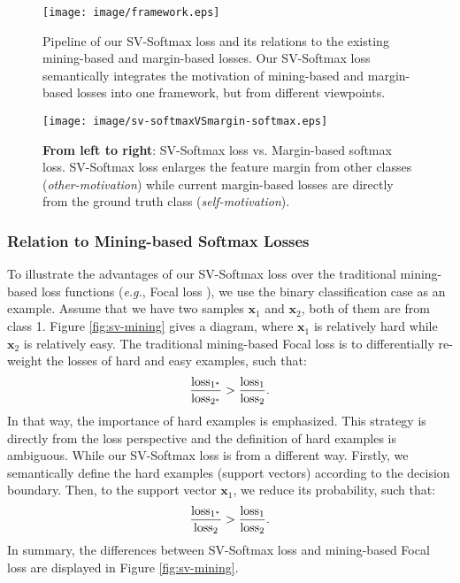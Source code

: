 \documentclass[10pt,twocolumn,letterpaper]{article}
\begin{document}
\begin{figure*}[t]
\begin{center}
   \texttt{[image: image/framework.eps]}
\end{center}
   \caption{Pipeline of our SV-Softmax loss and its relations to the existing mining-based and margin-based losses. Our SV-Softmax loss semantically integrates the motivation of mining-based and margin-based losses into one framework, but from different viewpoints.}
\label{fig:framework}
\end{figure*}

\begin{figure}[t]
\begin{center}
\texttt{[image: image/sv-softmaxVSmargin-softmax.eps]}
\end{center}
   \caption{\textbf{From left to right}: SV-Softmax loss vs. Margin-based softmax loss. SV-Softmax loss enlarges the feature margin from other classes (\textit{other-motivation}) while current margin-based losses are directly from the ground truth class (\textit{self-motivation}).}
\label{fig:sv-margin}
\end{figure}

\subsubsection{Relation to Mining-based Softmax Losses}
To illustrate the advantages of our SV-Softmax loss over the traditional mining-based loss functions (\textit{e.g.}, Focal loss \cite{Focal}), we use the binary classification case as an example. Assume that we have two samples $\bm{x}_1$ and $\bm{x}_2$, both of them are from class 1. Figure \ref{fig:sv-mining} gives a diagram, where $\bm{x}_1$ is relatively hard while $\bm{x}_2$ is relatively easy. The traditional mining-based Focal loss is to differentially re-weight the losses of hard and easy examples, such that:
\begin{equation}
 \frac{\rm{loss}_{1^*}}{\rm{loss}_{2^*}} > \frac{\rm{loss}_1}{\rm{loss}_2}.
\end{equation}
In that way, the importance of hard examples is emphasized. This strategy is directly from the loss perspective and the definition of hard examples is ambiguous. While our SV-Softmax loss is from a different way. Firstly, we semantically define the hard examples (support vectors) according to the decision boundary. Then, to the support vector $\bm{x}_1$, we reduce its probability, such that:
\begin{equation}
 \frac{\rm{loss}_{1^*}}{\rm{loss}_2} > \frac{\rm{loss}_1}{\rm{loss}_2}.
\end{equation}
In summary, the differences between SV-Softmax loss and mining-based Focal loss \cite{Focal} are displayed in Figure \ref{fig:sv-mining}.
\end{document}

